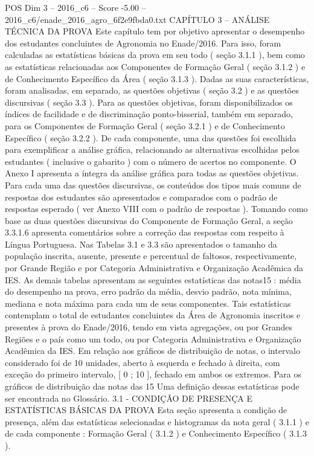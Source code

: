\begin{textsample}{POS Dim 3 – 2016\_c6 – Score -5.00 – 2016\_c6/enade\_2016\_agro\_6f2e9fbda0.txt}  \label{ex:f3_pos_251}
CAPÍTULO 3 – ANÁLISE TÉCNICA DA PROVA Este capítulo tem por objetivo apresentar o desempenho dos estudantes concluintes de Agronomia no Enade/2016.
Para isso, foram calculadas as estatísticas básicas da prova em seu todo ( seção 3.1.1 ), bem como as estatísticas relacionadas aos Componentes de Formação Geral ( seção 3.1.2 ) e de Conhecimento Específico da Área ( seção 3.1.3 ).
Dadas as suas características, foram analisadas, em separado, as questões objetivas ( seção 3.2 ) e as questões discursivas ( seção 3.3 ).
Para as questões objetivas, foram disponibilizados os índices de facilidade e de discriminação ponto-bisserial, também em separado, para os Componentes de Formação Geral ( seção 3.2.1 ) e de Conhecimento Específico ( seção 3.2.2 ).
De cada componente, uma das questões foi escolhida para exemplificar a análise gráfica, relacionando as alternativas escolhidas pelos estudantes ( inclusive o gabarito ) com o número de acertos no componente.
O Anexo I apresenta a íntegra da análise gráfica para todas as questões objetivas.
Para cada uma das questões discursivas, os conteúdos dos tipos mais comuns de respostas dos estudantes são apresentados e comparados com o padrão de respostas esperado ( ver Anexo VIII com o padrão de respostas ).
Tomando como base as duas questões discursivas do Componente de Formação Geral, a seção 3.3.1.6 apresenta comentários sobre a correção das respostas com respeito à Língua Portuguesa.
Nas Tabelas 3.1 e 3.3 são apresentados o tamanho da população inscrita, ausente, presente e percentual de faltosos, respectivamente, por Grande Região e por Categoria Administrativa e Organização Acadêmica da IES.
As demais tabelas apresentam as seguintes estatísticas das notas15 : média do desempenho na prova, erro padrão da média, desvio padrão, nota mínima, mediana e nota máxima para cada um de seus componentes.
Tais estatísticas contemplam o total de estudantes concluintes da Área de Agronomia inscritos e presentes à prova do Enade/2016, tendo em vista agregações, ou por Grandes Regiões e o país como um todo, ou por Categoria Administrativa e Organização Acadêmica da IES.
Em relação aos gráficos de distribuição de notas, o intervalo considerado foi de 10 unidades, aberto à esquerda e fechado à direita, com exceção do primeiro intervalo, [ 0 ; 10 ], fechado em ambos os extremos.
Para os gráficos de distribuição das notas das 15 Uma definição dessas estatísticas pode ser encontrada no Glossário. 3.1 - CONDIÇÃO DE PRESENÇA E ESTATÍSTICAS BÁSICAS DA PROVA Esta seção apresenta a condição de presença, além das estatísticas selecionadas e histogramas da nota geral ( 3.1.1 ) e de cada componente : Formação Geral ( 3.1.2 ) e Conhecimento Específico ( 3.1.3 ).

\end{textsample}
